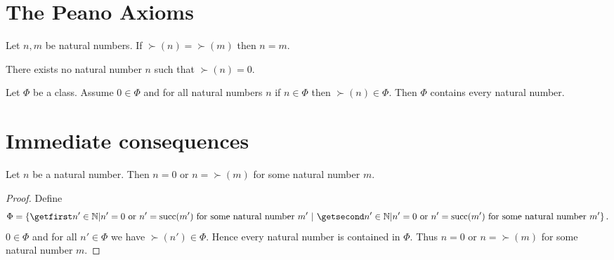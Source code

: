 \documentclass[../arithmetic.tex]{subfiles}
\begin{document}
  \section{The Peano Axioms}

  \begin{forthel}
    \begin{axiom}
      Let $n, m$ be natural numbers.
      If $\succ(n) = \succ(m)$ then $n = m$.
    \end{axiom}
  \end{forthel}

  \begin{forthel}
    \begin{axiom}
      There exists no natural number $n$ such that $\succ(n) = 0$.
    \end{axiom}
  \end{forthel}

  \begin{forthel}
    \begin{axiom}
      Let $\Phi$ be a class.
      Assume $0 \in \Phi$ and for all natural numbers $n$ if $n \in \Phi$ then
      $\succ(n) \in \Phi$.
      Then $\Phi$ contains every natural number.
    \end{axiom}
  \end{forthel}


  \section{Immediate consequences}

  \begin{forthel}
    \begin{proposition}
      Let $n$ be a natural number.
      Then $n = 0$ or $n = \succ(m)$ for some natural number $m$.
    \end{proposition}
    \begin{proof}
      Define \[ \Phi = \class{n' \in \Nat | \text{$n' = 0$ or
      $n' = \succ(m')$ for some natural number $m'$}}. \]
      $0 \in \Phi$ and for all $n' \in  \Phi$ we have $\succ(n') \in \Phi$.
      Hence every natural number is contained in $\Phi$.
      Thus $n = 0$ or $n = \succ(m)$ for some natural number $m$.
    \end{proof}
  \end{forthel}
\end{document}
